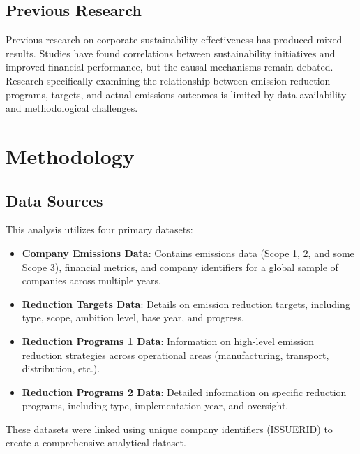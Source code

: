\documentclass[11pt,a4paper]{article}
\begin{document}
\subsection{Previous Research}
Previous research on corporate sustainability effectiveness has produced mixed results. Studies have found correlations between sustainability initiatives and improved financial performance, but the causal mechanisms remain debated. Research specifically examining the relationship between emission reduction programs, targets, and actual emissions outcomes is limited by data availability and methodological challenges.

\section{Methodology}

\subsection{Data Sources}
This analysis utilizes four primary datasets:

\begin{itemize}
    \item \textbf{Company Emissions Data}: Contains emissions data (Scope 1, 2, and some Scope 3), financial metrics, and company identifiers for a global sample of companies across multiple years.
    
    \item \textbf{Reduction Targets Data}: Details on emission reduction targets, including type, scope, ambition level, base year, and progress.
    
    \item \textbf{Reduction Programs 1 Data}: Information on high-level emission reduction strategies across operational areas (manufacturing, transport, distribution, etc.).
    
    \item \textbf{Reduction Programs 2 Data}: Detailed information on specific reduction programs, including type, implementation year, and oversight.
\end{itemize}

These datasets were linked using unique company identifiers (ISSUERID) to create a comprehensive analytical dataset.
\end{document}
